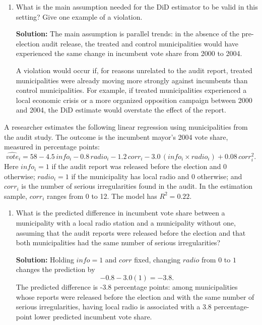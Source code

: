 \documentclass[11pt]{exam}
\begin{document}
\begin{questions}
\begin{enumerate}[leftmargin = 0.5cm, label = (\alph*), rightmargin = 0.2cm]
    \item What is the main assumption needed for the DiD estimator to be valid in this setting? Give one example of a violation.

    \begin{solutionorbox}[6cm]
    \textbf{Solution:} The main assumption is parallel trends: in the absence of the pre-election audit release, the treated and control municipalities would have experienced the same change in incumbent vote share from 2000 to 2004.

    A violation would occur if, for reasons unrelated to the audit report, treated municipalities were already moving more strongly against incumbents than control municipalities. For example, if treated municipalities experienced a local economic crisis or a more organized opposition campaign between 2000 and 2004, the DiD estimate would overstate the effect of the report.
    \end{solutionorbox}
\end{enumerate}

\question[2.5]
A researcher estimates the following linear regression using municipalities from the audit study. The outcome is the incumbent mayor's 2004 vote share, measured in percentage points:
\[
\widehat{vote}_i
=58-4.5\,info_i-0.8\,radio_i-1.2\,corr_i-3.0\,(info_i\times radio_i)+0.08\,corr_i^2.
\]
Here $info_i=1$ if the audit report was released before the election and $0$ otherwise; $radio_i=1$ if the municipality has local radio and $0$ otherwise; and $corr_i$ is the number of serious irregularities found in the audit. In the estimation sample, $corr_i$ ranges from 0 to 12. The model has $R^2=0.22$.

\begin{enumerate}[leftmargin = 0.5cm, label = (\alph*), rightmargin = 0.2cm]
    \item What is the predicted difference in incumbent vote share between a municipality with a local radio station and a municipality without one, assuming that the audit reports were released before the election and that both municipalities had the same number of serious irregularities?

    \begin{solutionorbox}[4.8cm]
    \textbf{Solution:} Holding $info=1$ and $corr$ fixed, changing $radio$ from $0$ to $1$ changes the prediction by
    \[
    -0.8-3.0(1)=-3.8.
    \]
    The predicted difference is -3.8 percentage points: among municipalities whose reports were released before the election and with the same number of serious irregularities, having local radio is associated with a 3.8 percentage-point lower predicted incumbent vote share.
    \end{solutionorbox}


\end{enumerate}
\end{questions}
\end{document}
